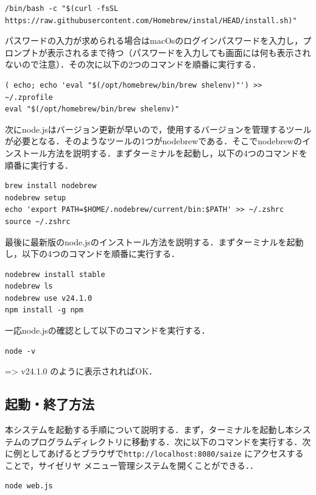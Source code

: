 \documentclass[uplatex,dvipdfmx]{jsarticle}
\begin{document}
\begin{lstlisting}
/bin/bash -c "$(curl -fsSL https://raw.githubusercontent.com/Homebrew/instal/HEAD/install.sh)"
\end{lstlisting}

パスワードの入力が求められる場合はmacOsのログインパスワードを入力し，プロンプトが表示されるまで待つ（パスワードを入力しても画面には何も表示されないので注意）．その次に以下の2つのコマンドを順番に実行する．

\begin{lstlisting}
( echo; echo 'eval "$(/opt/homebrew/bin/brew shelenv)"') >> ~/.zprofile
eval "$(/opt/homebrew/bin/brew shelenv)"
\end{lstlisting}

次にnode.jsはバージョン更新が早いので，使用するバージョンを管理するツールが必要となる．そのようなツールの1つがnodebrewである．そこでnodebrewのインストール方法を説明する．まずターミナルを起動し，以下の4つのコマンドを順番に実行する．

\begin{lstlisting}
brew install nodebrew
nodebrew setup
echo 'export PATH=$HOME/.nodebrew/current/bin:$PATH' >> ~/.zshrc
source ~/.zshrc
\end{lstlisting}

最後に最新版のnode.jsのインストール方法を説明する．まずターミナルを起動し，以下の4つのコマンドを順番に実行する．

\begin{lstlisting}
nodebrew install stable
nodebrew ls
nodebrew use v24.1.0
npm install -g npm
\end{lstlisting}

一応node.jsの確認として以下のコマンドを実行する．

\begin{lstlisting}
node -v
\end{lstlisting}

=> v24.1.0 のように表示されればOK．

\subsection{起動・終了方法}

本システムを起動する手順について説明する．まず，ターミナルを起動し本システムのプログラムディレクトリに移動する．次に以下のコマンドを実行する．次に例としてあげるとブラウザで\texttt{http://localhost:8080/saize} にアクセスすることで，サイゼリヤ メニュー管理システムを開くことができる．．

\begin{lstlisting}
node web.js
\end{lstlisting}
\end{document}
